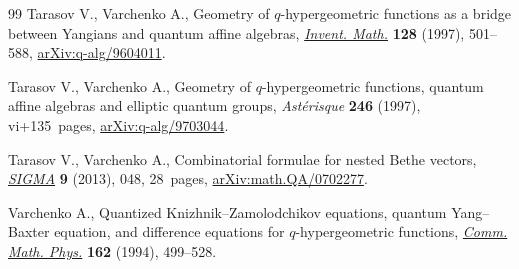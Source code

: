 \documentclass[10pt,a4paper]{amsart}
\numberwithin{equation}{section}
\begin{document}
\begin{thebibliography}{99}
Tarasov V., Varchenko A., Geometry of {$q$}-hypergeometric functions as a
 bridge between {Y}angians and quantum affine algebras, \href{https://doi.org/10.1007/s002220050151}{\textit{Invent. Math.}}
 \textbf{128} (1997), 501--588, \href{https://arxiv.org/abs/q-alg/9604011}{arXiv:q-alg/9604011}.

Tarasov V., Varchenko A., Geometry of {$q$}-hypergeometric functions, quantum
 affine algebras and elliptic quantum groups, \textit{Ast\'{e}risque}
 \textbf{246} (1997), vi+135~pages, \href{https://arxiv.org/abs/q-alg/9703044}{arXiv:q-alg/9703044}.

Tarasov V., Varchenko A., Combinatorial formulae for nested {B}ethe vectors,
 \href{https://doi.org/10.3842/SIGMA.2013.048}{\textit{SIGMA}} \textbf{9} (2013), 048, 28~pages, \href{https://arxiv.org/abs/math.QA/0702277}{arXiv:math.QA/0702277}.

Varchenko A., Quantized {K}nizhnik--{Z}amolodchikov equations, quantum
 {Y}ang--{B}axter equation, and dif\-fe\-rence equations for {$q$}-hypergeometric
 functions, \href{https://doi.org/10.1007/BF02101745}{\textit{Comm. Math. Phys.}} \textbf{162} (1994), 499--528.

\end{thebibliography}
\end{document}
